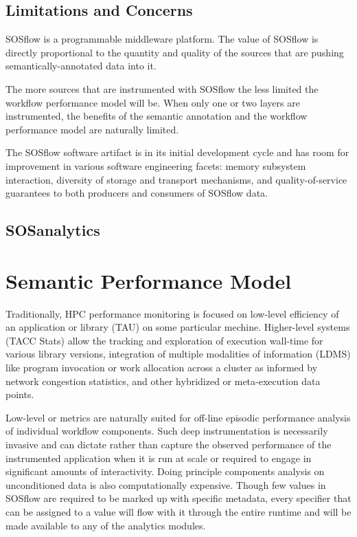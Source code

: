 \subsection{Limitations and Concerns}
SOSflow is a programmable middleware platform.  The value of SOSflow is
directly proportional to the quantity and quality of the sources that
are pushing semantically-annotated data into it.

The more sources that are instrumented with SOSflow the less limited
the workflow performance model will be. When only one or two layers
are instrumented, the benefits of the semantic annotation and the
workflow performance model are naturally limited.

The SOSflow software artifact is in its initial development cycle and
has room for improvement in various software engineering facets:
memory subsystem interaction, diversity of storage and transport
mechanisms, and quality-of-service guarantees to both producers and
consumers of SOSflow data.


\subsection{SOSanalytics}






\section{Semantic Performance Model}


Traditionally, HPC performance monitoring is focused on low-level
efficiency of an application or library (TAU) on some particular mechine.
Higher-level systems (TACC Stats) allow the tracking and exploration
of execution wall-time for various library versions, integration of
multiple modalities of information (LDMS) like program invocation or
work allocation across a cluster as informed by network congestion
statistics, and other hybridized or meta-execution data points.

Low-level or metrics are naturally suited for off-line episodic
performance analysis of individual workflow components. Such deep
instrumentation is necessarily invasive and can dictate rather than
capture the observed performance of the instrumented application when
it is run at scale or required to engage in significant amounts of
interactivity. Doing principle components analysis on unconditioned
data is also computationally expensive.  Though few values in SOSflow
are required to be marked up with specific metadata, every specifier
that can be assigned to a value will flow with it through the entire
runtime and will be made available to any of the analytics modules.

